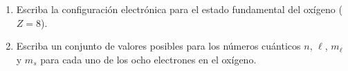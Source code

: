 \item \begin{enumerate}
    \item Escriba la configuración electrónica para el estado fundamental del oxígeno ($Z = 8$).
    \item Escriba un conjunto de valores posibles para los números cuánticos $n$, $\ell$, $m_{\ell}$ y $m_s$ para cada uno de los ocho electrones en el oxígeno.
\end{enumerate}